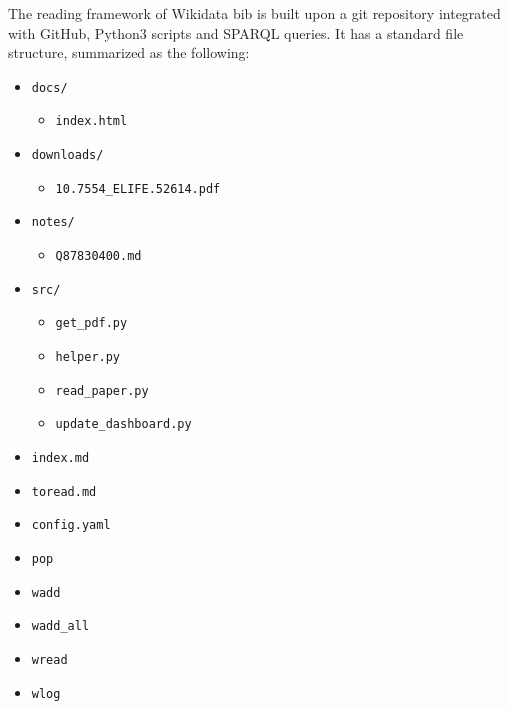 The reading framework of Wikidata bib is built upon a git repository integrated with GitHub, Python3 scripts and SPARQL queries.
It has a standard file structure, summarized as the following:

\begin{itemize}
\tightlist
\item
  \texttt{docs/}

  \begin{itemize}
  \tightlist
  \item
    \texttt{index.html}
  \end{itemize}
\item
  \texttt{downloads/}

  \begin{itemize}
  \tightlist
  \item
    \texttt{10.7554\_ELIFE.52614.pdf}
  \end{itemize}
\item
  \texttt{notes/}

  \begin{itemize}
  \tightlist
  \item
    \texttt{Q87830400.md}
  \end{itemize}
\item
  \texttt{src/}

  \begin{itemize}
  \tightlist
  \item
    \texttt{get\_pdf.py}
  \item
    \texttt{helper.py}
  \item
    \texttt{read\_paper.py}
  \item
    \texttt{update\_dashboard.py}
  \end{itemize}
\item
  \texttt{index.md}
\item
  \texttt{toread.md}
\item
  \texttt{config.yaml}
\item
  \texttt{pop}
\item
  \texttt{wadd}
\item
  \texttt{wadd\_all}
\item
  \texttt{wread}
\item
  \texttt{wlog}
\end{itemize}

